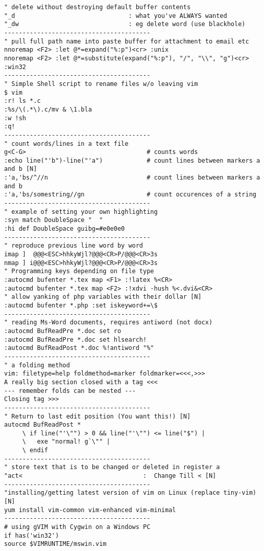 \documentclass[10pt,landscape]{article}
\begin{document}
\begin{multicols}{2}
\begin{verbatim}
" delete without destroying default buffer contents
"_d                               : what you've ALWAYS wanted
"_dw                              : eg delete word (use blackhole)
----------------------------------------
" pull full path name into paste buffer for attachment to email etc
nnoremap <F2> :let @*=expand("%:p")<cr> :unix
nnoremap <F2> :let @*=substitute(expand("%:p"), "/", "\\", "g")<cr> :win32
----------------------------------------
" Simple Shell script to rename files w/o leaving vim
$ vim
:r! ls *.c
:%s/\(.*\).c/mv & \1.bla
:w !sh
:q!
----------------------------------------
" count words/lines in a text file
g<C-G>                                 # counts words
:echo line("'b")-line("'a")            # count lines between markers a and b [N]
:'a,'bs/^//n                           # count lines between markers a and b
:'a,'bs/somestring//gn                 # count occurences of a string
----------------------------------------
" example of setting your own highlighting
:syn match DoubleSpace "  "
:hi def DoubleSpace guibg=#e0e0e0
----------------------------------------
" reproduce previous line word by word
imap ]  @@@<ESC>hhkyWjl?@@@<CR>P/@@@<CR>3s
nmap ] i@@@<ESC>hhkyWjl?@@@<CR>P/@@@<CR>3s
" Programming keys depending on file type
:autocmd bufenter *.tex map <F1> :!latex %<CR>
:autocmd bufenter *.tex map <F2> :!xdvi -hush %<.dvi&<CR>
" allow yanking of php variables with their dollar [N]
:autocmd bufenter *.php :set iskeyword+=\$ 
----------------------------------------
" reading Ms-Word documents, requires antiword (not docx)
:autocmd BufReadPre *.doc set ro
:autocmd BufReadPre *.doc set hlsearch!
:autocmd BufReadPost *.doc %!antiword "%"
----------------------------------------
" a folding method
vim: filetype=help foldmethod=marker foldmarker=<<<,>>>
A really big section closed with a tag <<< 
--- remember folds can be nested --- 
Closing tag >>> 
----------------------------------------
" Return to last edit position (You want this!) [N]
autocmd BufReadPost *
     \ if line("'\"") > 0 && line("'\"") <= line("$") |
     \   exe "normal! g`\"" |
     \ endif
----------------------------------------
" store text that is to be changed or deleted in register a
"act<                                 :  Change Till < [N]
----------------------------------------
"installing/getting latest version of vim on Linux (replace tiny-vim) [N]
yum install vim-common vim-enhanced vim-minimal
----------------------------------------
# using gVIM with Cygwin on a Windows PC
if has('win32')
source $VIMRUNTIME/mswin.vim

\end{verbatim}
\end{multicols}
\end{document}
